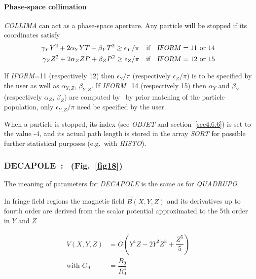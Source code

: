 \paragraph{Phase-space collimation}

\noindent \textsl{COLLIMA}  can act as a phase-space aperture. 
Any particle will be stopped if its coordinates satisfy 
\begin{align*}
	\gamma_Y Y^2 + 2\alpha_Y Y T + \beta_Y T^2 \geq  \epsilon_Y/\pi 
	   &   \quad \text{if}\quad  \text{\textsl{IFORM}}=11  \text{ or 14} \\
	\gamma_Z Z^2 + 2\alpha_Z Z P + \beta_Z P^2 \geq  \epsilon_Z/\pi 
	   &   \quad \text{if}\quad  \text{\textsl{IFORM}}=12  \text{ or 15}
\end{align*}

\noindent If \textsl{IFORM}=11 (respectively 12) then $\epsilon_Y/\pi$  (respectively $\epsilon_Z/\pi$) 
is to be specified by the user as well as $\alpha_{Y,Z}$, $\beta_{Y,Z}$. 
If \textsl{IFORM}=14 (respectively 15) then $\alpha_Y$ and  $\beta_Y$  (respectively $\alpha_Z$,  $\beta_Z$) 
are computed by \zgoubi\ by prior 
matching of the particle population, only $\epsilon_{Y,Z}/\pi$ need be specified by the user. 




\bigskip

\noindent When a particle is stopped, its index \IEX{} (see \textsl{OBJET}
and section~\ref{sec4.6.6}) is set to the value -4, and its actual path length is stored in 
the array \textsl{SORT}  for possible further statistical purposes (e.g.~with 
\textsl{HISTO}). 


\newpage

\subsubsection*{DECAPOLE~:  \DECAPOLETitl\ (Fig.~\protect\ref{fig18})} \label{DECAPOLE} 
\medskip

The meaning of parameters for \textsl{DECAPOLE}  is the same as for \textsl{QUADRUPO}.  

\noindent In fringe field regions the magnetic field $ \vec  B(X,Y,Z) $ and
its derivatives up to fourth order are derived from the scalar potential approximated to 
the 5th order in $ Y $ and $ Z $ 

\begin{align*}
	V(X,Y,Z) &   =    G \left(Y^4Z-2Y^2Z^3+ \dfrac{Z^5 }{ 5}\right)  \\
	\text{with  } G_0 &   = \dfrac{ B_0 }{ R^4_0} 
\end{align*}


